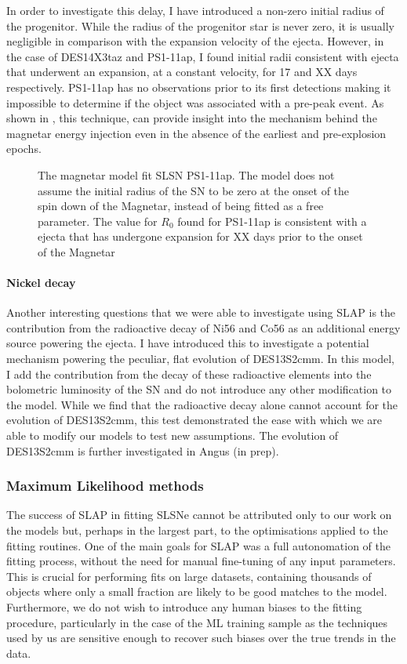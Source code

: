 In order to investigate this delay, I have introduced a non-zero initial radius of the progenitor. While the radius of the progenitor star is never zero, it is usually negligible in comparison with the expansion velocity of the ejecta. However, in the case of DES14X3taz and PS1-11ap, I found initial radii consistent with ejecta that underwent an expansion, at a constant velocity, for 17 and XX days respectively. PS1-11ap has no observations prior to its first detections making it impossible to determine if the object was associated with a pre-peak event. As shown in , this technique, can provide insight into the mechanism behind the magnetar energy injection even in the absence of the earliest and pre-explosion epochs.

\begin{figure}
  \caption{The magnetar model fit SLSN PS1-11ap. The model does not assume the initial radius of the SN to be zero at the onset of the spin down of the Magnetar, instead of being fitted as a free parameter. The value for $R_0$ found for PS1-11ap is consistent with a ejecta that has undergone expansion for XX days prior to the onset of the Magnetar}
  \label{fig:PS1-11apR0}
\end{figure}

\paragraph{Nickel decay}
Another interesting questions that we were able to investigate using \textsc{SLAP} is the contribution from the radioactive decay of Ni56 and Co56 as an additional energy source powering the ejecta. I have introduced this to investigate a potential mechanism powering the peculiar, flat evolution of DES13S2cmm. In this model, I add the contribution from the decay of these radioactive elements into the bolometric luminosity of the SN and do not introduce any other modification to the model. While we find that the radioactive decay alone cannot account for the evolution of DES13S2cmm, this test demonstrated the ease with which we are able to modify our models to test new assumptions. The evolution of DES13S2cmm is further investigated in Angus (in prep).

\subsubsection{Maximum Likelihood methods}
The success of \textsc{SLAP} in fitting SLSNe cannot be attributed only to our work on the models but, perhaps in the largest part, to the optimisations applied to the fitting routines. One of the main goals for \textsc{SLAP} was a full autonomation of the fitting process, without the need for manual fine-tuning of any input parameters. This is crucial for performing fits on large datasets, containing thousands of objects where only a small fraction are likely to be good matches to the model. Furthermore, we do not wish to introduce any human biases to the fitting procedure, particularly in the case of the ML training sample as the techniques used by us are sensitive enough to recover such biases over the true trends in the data.

